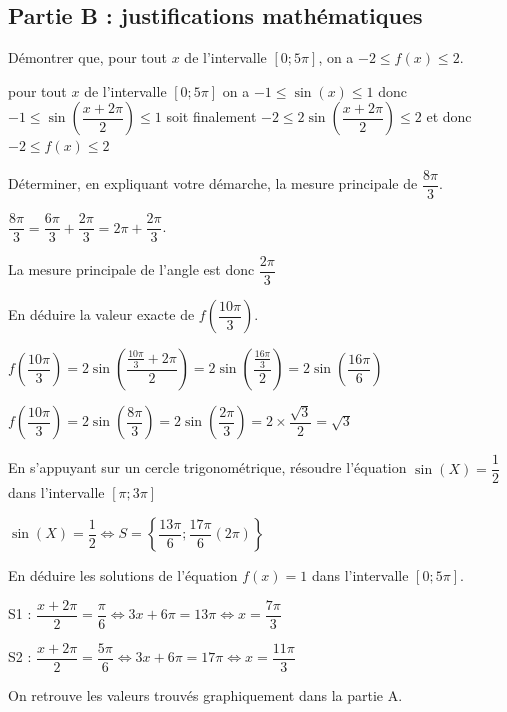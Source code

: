 \documentclass[12pt,a4paper]{article}  %
\begin{document}
\subsection*{Partie B : justifications mathématiques}
\begin{enumMet}
	\item Démontrer que, pour tout $x$ de l'intervalle $[0 ; 5 \pi]$, on a $-2 \leqslant f(x) \leqslant 2$.
	\begin{corrBox}
		pour tout $x$ de l'intervalle $[0 ; 5 \pi]$ on a $-1\leqslant \sin(x)\leqslant 1$
		donc $-1\leqslant \sin \left(\dfrac{x+2\pi}{2}\right)\leqslant 1$
		soit finalement $-2\leqslant 2\sin \left(\dfrac{x+2\pi}{2}\right)\leqslant 2$ et donc $-2\leqslant f(x)\leqslant 2$	
	\end{corrBox}
	\item \begin{enumMet}
		\item Déterminer, en expliquant votre démarche, la mesure principale de $\dfrac{8 \pi}{3}$.
		\begin{corrBox}
			$\dfrac{8 \pi}{3}=\dfrac{6 \pi}{3}+\dfrac{2\pi}{3}=2\pi+\dfrac{2\pi}{3}$.
			
			La mesure principale de l'angle est donc $\dfrac{2\pi}{3}$		
		\end{corrBox}
		\item En déduire la valeur exacte de $f\left(\dfrac{10 \pi}{3}\right)$.
		\begin{corrBox}
			$f\left(\dfrac{10 \pi}{3}\right)=2\sin \left(\dfrac{\frac{10\pi}{3}+2\pi}{2}\right)=2\sin \left(\dfrac{\frac{16\pi}{3}}{2}\right)=2\sin \left(\dfrac{16\pi}{6}\right)$
			
			$f\left(\dfrac{10 \pi}{3}\right)=2\sin \left(\dfrac{8\pi}{3}\right)=2\sin \left(\dfrac{2\pi}{3}\right)=2\times \dfrac{\sqrt{3}}{2}=\sqrt{3}$		
		\end{corrBox}
	\end{enumMet}
	\item \begin{enumMet}
		\item En s'appuyant sur un cercle trigonométrique, résoudre l'équation $\sin (X)=\dfrac{1}{2}$ dans l'intervalle $\left[\pi ; 3 \pi\right]$
		\begin{corrBox}
			$\sin (X)=\dfrac{1}{2} \iff S=\left\{\dfrac{13\pi}{6};\dfrac{17\pi}{6}(2\pi)\right\}$		
		\end{corrBox}
		\item En déduire les solutions de l'équation $f(x)=1$ dans l'intervalle $[0 ; 5 \pi]$.
		\begin{corrBox}
			S1 : $\dfrac{x+2\pi}{2}=\dfrac{\pi}{6}\iff 3x+6\pi=13\pi \iff x=\dfrac{7\pi}{3}$
			
			S2 : $\dfrac{x+2\pi}{2}=\dfrac{5\pi}{6}\iff 3x+6\pi=17\pi \iff x=\dfrac{11\pi}{3}$
			
			On retrouve les valeurs trouvés graphiquement dans la partie A. 		
		\end{corrBox}
	\end{enumMet}
\end{enumMet}
\end{document}
